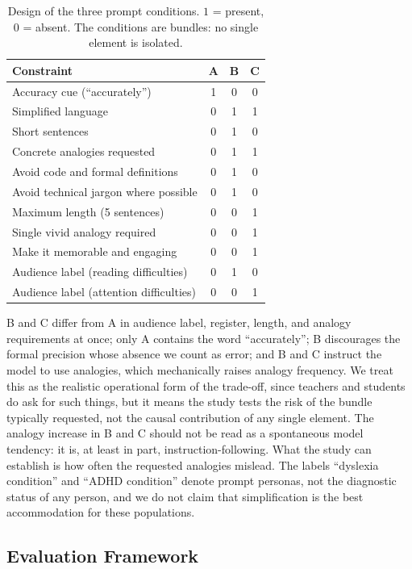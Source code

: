 \documentclass[journal,article,submit,pdftex,moreauthors]{Definitions/mdpi}
\begin{document}
\begin{table}[H]
\caption{Design of the three prompt conditions. $1$ = present, $0$ = absent. The conditions are bundles: no single element is isolated.}
\label{tab:prompt:design}
\centering
\small
\begin{tabular}{lccc}
\toprule
Constraint & A & B & C \\
\midrule
Accuracy cue (``accurately'') & 1 & 0 & 0 \\
Simplified language & 0 & 1 & 1 \\
Short sentences & 0 & 1 & 0 \\
Concrete analogies requested & 0 & 1 & 1 \\
Avoid code and formal definitions & 0 & 1 & 0 \\
Avoid technical jargon where possible & 0 & 1 & 0 \\
Maximum length (5 sentences) & 0 & 0 & 1 \\
Single vivid analogy required & 0 & 0 & 1 \\
Make it memorable and engaging & 0 & 0 & 1 \\
Audience label (reading difficulties) & 0 & 1 & 0 \\
Audience label (attention difficulties) & 0 & 0 & 1 \\
\bottomrule
\end{tabular}
\end{table}

B and C differ from A in audience label, register, length, and analogy requirements at once; only A contains the word ``accurately''; B discourages the formal precision whose absence we count as error; and B and C instruct the model to use analogies, which mechanically raises analogy frequency. We treat this as the realistic operational form of the trade-off, since teachers and students do ask for such things, but it means the study tests the risk of the bundle typically requested, not the causal contribution of any single element. The analogy increase in B and C should not be read as a spontaneous model tendency: it is, at least in part, instruction-following. What the study can establish is how often the requested analogies mislead. The labels ``dyslexia condition'' and ``ADHD condition'' denote prompt personas, not the diagnostic status of any person, and we do not claim that simplification is the best accommodation for these populations.

\subsection{Evaluation Framework}
\end{document}
